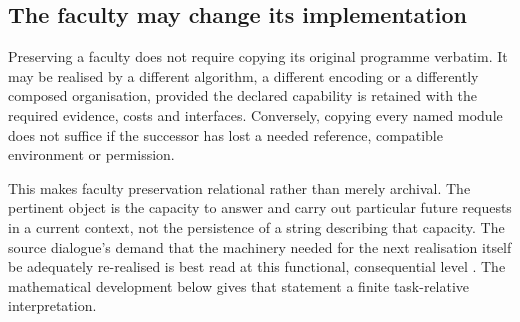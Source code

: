 \subsection{The faculty may change its implementation}

Preserving a faculty does not require copying its original programme verbatim. It may be realised by a different algorithm, a different encoding or a differently composed organisation, provided the declared capability is retained with the required evidence, costs and interfaces. Conversely, copying every named module does not suffice if the successor has lost a needed reference, compatible environment or permission.

This makes faculty preservation relational rather than merely archival. The pertinent object is the capacity to answer and carry out particular future requests in a current context, not the persistence of a string describing that capacity. The source dialogue's demand that the machinery needed for the next realisation itself be adequately re-realised is best read at this functional, consequential level \cite[07:08:04]{D}. The mathematical development below gives that statement a finite task-relative interpretation.
